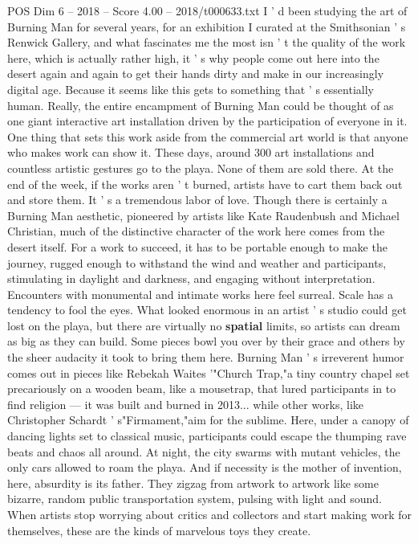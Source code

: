 \begin{textsample}{POS Dim 6 – 2018 – Score 4.00 – 2018/t000633.txt}
I ' d been studying the art of Burning Man for several years, for an exhibition I curated at the Smithsonian ' s Renwick Gallery, and what fascinates me the most isn ' t the quality of the work here, which is actually rather high, it ' s why people come out here into the desert again and again to get their hands dirty and make in our increasingly digital age.
Because it seems like this gets to something that ' s essentially human.
Really, the entire encampment of Burning Man could be thought of as one giant interactive art installation driven by the participation of everyone in it.
One thing that sets this work aside from the commercial art world is that anyone who makes work can show it.
These days, around 300 art installations and countless artistic gestures go to the playa.
None of them are sold there.
At the end of the week, if the works aren ' t burned, artists have to cart them back out and store them.
It ' s a tremendous labor of love.
Though there is certainly a Burning Man aesthetic, pioneered by artists like Kate Raudenbush and Michael Christian, much of the distinctive character of the work here comes from the desert itself.
For a work to succeed, it has to be portable enough to make the journey, rugged enough to withstand the wind and weather and participants, stimulating in daylight and darkness, and engaging without interpretation.
Encounters with monumental and intimate works here feel surreal.
Scale has a tendency to fool the eyes.
What looked enormous in an artist ' s studio could get lost on the playa, but there are virtually no \textbf{spatial} limits, so artists can dream as big as they can build.
Some pieces bowl you over by their grace and others by the sheer audacity it took to bring them here.
Burning Man ' s irreverent humor comes out in pieces like Rebekah Waites '"Church Trap,"a tiny country chapel set precariously on a wooden beam, like a mousetrap, that lured participants in to find religion — it was built and burned in 2013... while other works, like Christopher Schardt ' s"Firmament,"aim for the sublime.
Here, under a canopy of dancing lights set to classical music, participants could escape the thumping rave beats and chaos all around.
At night, the city swarms with mutant vehicles, the only cars allowed to roam the playa.
And if necessity is the mother of invention, here, absurdity is its father.
They zigzag from artwork to artwork like some bizarre, random public transportation system, pulsing with light and sound.
When artists stop worrying about critics and collectors and start making work for themselves, these are the kinds of marvelous toys they create.

\end{textsample}
